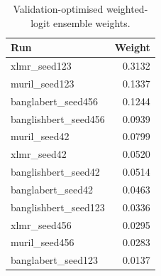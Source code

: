 \begin{table}
\caption{Validation-optimised weighted-logit ensemble weights.}
\label{tab:ensemble_weights}
\begin{tabular}{lr}
\toprule
Run & Weight \\
\midrule
xlmr_seed123 & 0.3132 \\
muril_seed123 & 0.1337 \\
banglabert_seed456 & 0.1244 \\
banglishbert_seed456 & 0.0939 \\
muril_seed42 & 0.0799 \\
xlmr_seed42 & 0.0520 \\
banglishbert_seed42 & 0.0514 \\
banglabert_seed42 & 0.0463 \\
banglishbert_seed123 & 0.0336 \\
xlmr_seed456 & 0.0295 \\
muril_seed456 & 0.0283 \\
banglabert_seed123 & 0.0137 \\
\bottomrule
\end{tabular}
\end{table}
